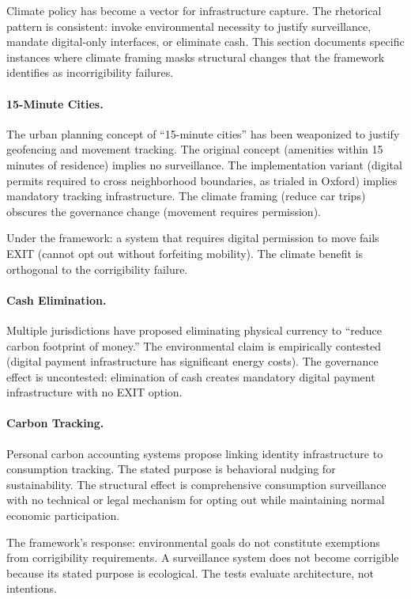\documentclass{article}
\begin{document}
Climate policy has become a vector for infrastructure capture. The rhetorical pattern is consistent: invoke environmental necessity to justify surveillance, mandate digital-only interfaces, or eliminate cash. This section documents specific instances where climate framing masks structural changes that the framework identifies as incorrigibility failures.

\paragraph{15-Minute Cities.} The urban planning concept of ``15-minute cities'' has been weaponized to justify geofencing and movement tracking. The original concept (amenities within 15 minutes of residence) implies no surveillance. The implementation variant (digital permits required to cross neighborhood boundaries, as trialed in Oxford) implies mandatory tracking infrastructure. The climate framing (reduce car trips) obscures the governance change (movement requires permission).

Under the framework: a system that requires digital permission to move fails EXIT (cannot opt out without forfeiting mobility). The climate benefit is orthogonal to the corrigibility failure.

\paragraph{Cash Elimination.} Multiple jurisdictions have proposed eliminating physical currency to ``reduce carbon footprint of money.'' The environmental claim is empirically contested (digital payment infrastructure has significant energy costs). The governance effect is uncontested: elimination of cash creates mandatory digital payment infrastructure with no EXIT option.

\paragraph{Carbon Tracking.} Personal carbon accounting systems propose linking identity infrastructure to consumption tracking. The stated purpose is behavioral nudging for sustainability. The structural effect is comprehensive consumption surveillance with no technical or legal mechanism for opting out while maintaining normal economic participation.

The framework's response: environmental goals do not constitute exemptions from corrigibility requirements. A surveillance system does not become corrigible because its stated purpose is ecological. The tests evaluate architecture, not intentions.
\end{document}
